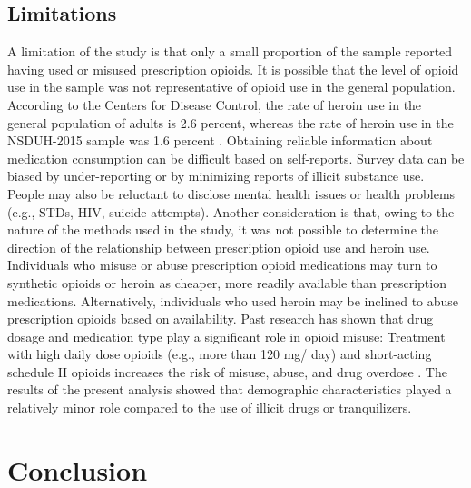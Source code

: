 \documentclass[sigconf]{acmart}
\begin{document}
\subsection{Limitations}

A limitation of the study is that only a small proportion of the sample 
reported having used or misused prescription opioids. It is possible that the 
level of opioid use in the sample was not representative of opioid use in the 
general population. According to the Centers for Disease Control, the rate
of heroin use in the general population of adults is 2.6 percent, whereas
the rate of heroin use in the NSDUH-2015 sample was 1.6 percent \cite{cdc16}. 
Obtaining reliable information about medication consumption can be difficult 
based on self-reports. Survey data can be biased by under-reporting or by 
minimizing reports of illicit substance use. People may also be reluctant to 
disclose mental health issues or health problems (e.g., STDs, HIV, suicide 
attempts). Another consideration is that, owing to the nature of the methods 
used in the study, it was not possible to determine the direction of the 
relationship between prescription opioid use and heroin use. Individuals who 
misuse or abuse prescription opioid medications may turn to synthetic opioids 
or heroin as cheaper, more readily available than prescription medications. 
Alternatively, individuals who used heroin may be inclined to abuse 
prescription opioids based on availability. Past research has shown that drug 
dosage and medication type play a significant role in opioid misuse: Treatment 
with high daily dose opioids (e.g., more than 120 mg/ day) and short-acting 
schedule II opioids increases the risk of misuse, abuse, and drug overdose 
\cite{sullivan10}. The results of the present analysis showed that demographic 
characteristics played a relatively minor role compared to the use of illicit 
drugs or tranquilizers. 

\section{Conclusion}
\end{document}
